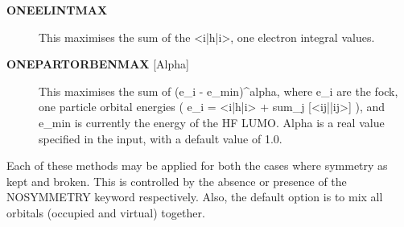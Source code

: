 \documentclass[openany,a4paper,10pt]{manual}
\begin{document}
\begin{description}
\item[\textbf{ONEELINTMAX}]
This maximises the sum of the \textless{}i|h|i\textgreater{}, one electron integral values.

\item[\textbf{ONEPARTORBENMAX} {[}Alpha{]}]
This maximises the sum of (e\_i - e\_min)\textasciicircum{}alpha, where e\_i are the fock, one particle orbital
energies ( e\_i = \textless{}i|h|i\textgreater{} + sum\_j {[}\textless{}ij||ij\textgreater{}{]} ), and e\_min is currently the energy of the
HF LUMO.
Alpha is a real value specified in the input, with a default value of 1.0.

\end{description}

Each of these methods may be applied for both the cases where symmetry as kept and broken.
This is controlled by the absence or presence of the NOSYMMETRY keyword respectively.
Also, the default option is to mix all orbitals (occupied and virtual) together.
\end{document}
